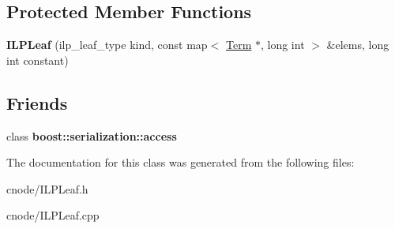 \subsection*{\-Protected \-Member \-Functions}
\begin{DoxyCompactItemize}
\item 
\hypertarget{classILPLeaf_acd83ccdf9b353bf2ffb97f0e67238981}{{\bfseries \-I\-L\-P\-Leaf} (ilp\-\_\-leaf\-\_\-type kind, const map$<$ \hyperlink{classTerm}{\-Term} $\ast$, long int $>$ \&elems, long int constant)}\label{classILPLeaf_acd83ccdf9b353bf2ffb97f0e67238981}

\end{DoxyCompactItemize}
\subsection*{\-Friends}
\begin{DoxyCompactItemize}
\item 
\hypertarget{classILPLeaf_ac98d07dd8f7b70e16ccb9a01abf56b9c}{class {\bfseries boost\-::serialization\-::access}}\label{classILPLeaf_ac98d07dd8f7b70e16ccb9a01abf56b9c}

\end{DoxyCompactItemize}


\-The documentation for this class was generated from the following files\-:\begin{DoxyCompactItemize}
\item 
cnode/\-I\-L\-P\-Leaf.\-h\item 
cnode/\-I\-L\-P\-Leaf.\-cpp\end{DoxyCompactItemize}
